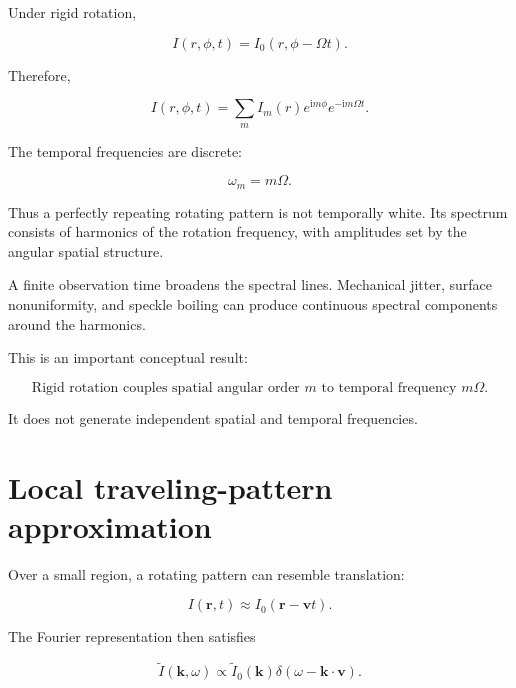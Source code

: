 \documentclass[11pt]{article}
\newcommand{\ii}{\mathrm{i}}
\newcommand{\kvec}{\mathbf{k}}
\newcommand{\rvec}{\mathbf{r}}
\begin{document}
Under rigid rotation,

\begin{equation}
    I(r,\phi,t)
    =
    I_0(r,\phi-\Omega t).
\end{equation}

Therefore,

\begin{equation}
    I(r,\phi,t)
    =
    \sum_m
    I_m(r)
    e^{\ii m\phi}
    e^{-\ii m\Omega t}.
\end{equation}

The temporal frequencies are discrete:

\begin{equation}
\boxed{
    \omega_m=m\Omega.
}
\end{equation}

Thus a perfectly repeating rotating pattern is not temporally white. Its
spectrum consists of harmonics of the rotation frequency, with amplitudes
set by the angular spatial structure.

A finite observation time broadens the spectral lines. Mechanical jitter,
surface nonuniformity, and speckle boiling can produce continuous spectral
components around the harmonics.

This is an important conceptual result:

\begin{equation}
\boxed{
    \text{Rigid rotation couples spatial angular order }m
    \text{ to temporal frequency }m\Omega.
}
\end{equation}

It does not generate independent spatial and temporal frequencies.

\section{Local traveling-pattern approximation}

Over a small region, a rotating pattern can resemble translation:

\begin{equation}
    I(\rvec,t)
    \approx
    I_0(\rvec-\mathbf{v}t).
\end{equation}

The Fourier representation then satisfies

\begin{equation}
    \widetilde{I}(\kvec,\omega)
    \propto
    \widetilde{I}_0(\kvec)
    \delta(\omega-\kvec\cdot\mathbf{v}).
\end{equation}
\end{document}
